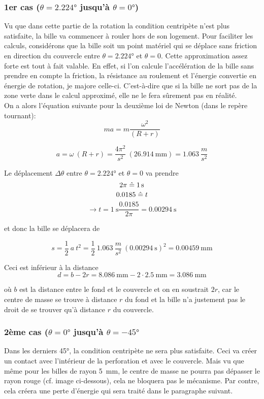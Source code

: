 \subsubsection{1er cas ($\theta = \ang{2.224}$
jusqu'à $\theta = \ang{0}$)}
Vu que dans cette partie de la rotation la condition centripète n'est plus satisfaite, la bille va commencer à rouler hors de son logement. Pour faciliter les calculs, considérons que la bille soit un point matériel qui se déplace sans friction en direction du couvercle entre $\theta = \ang{2.224}$
et $\theta = 0$. 
Cette approximation assez forte est tout à fait valable. En effet, si l'on calcule l'accélération de la bille sans prendre en compte la friction, la résistance au roulement et l'énergie convertie en énergie de rotation, je majore celle-ci. C'est-à-dire que si la bille ne sort pas de la zone verte dans le calcul approximé, elle ne le fera sûrement pas en réalité.\\

On a alors l'équation suivante pour la deuxième loi de Newton (dans le repère tournant):
\[ma = m \frac{\omega^{2}}{(R + r)}\]

\[a = \omega \ (R + r) = \frac{4 \pi^{2}}{s^{2}} \ (\SI{26.914}{\milli\metre}) = 1.063 \ \frac{m}{s^{2}}\]

Le déplacement $\Delta\theta$ entre $\theta =\ang{2.224}$ et $\theta = 0$ va prendre
\[2 \pi \estimates \SI{1}{\s}\]
\[0.0185 \mathrel{\hat{=}} t \]
\[\rightarrow t = \SI{1}{\s} \frac{0.0185}{2 \pi} = \SI{0.00294}{\second}\]

et donc la bille se déplacera de 

\[s = \frac{1}{2} \ a \ t^{2} = \frac{1}{2} \ 1.063 \ \frac{m}{s^{2}} \ (\SI{0.00294}{\s})^{2} = \SI{0.00459}{\milli\metre}\]

Ceci est inférieur à la distance 
\[d = b - 2r = \SI{8.086}{\milli\metre} - 2 \cdot \SI{2.5}{\milli\metre} = \SI{3.086}{\milli\metre}\]

où $b$ est la distance entre le fond et le couvercle et on en soustrait $2r$, car le centre de masse se trouve à distance $r$ du fond et la bille n'a justement pas le droit de se trouver qu'à distance $r$ du couvercle.

\subsubsection{2ème cas ($\theta = \ang{0}$ jusqu'à $\theta = \ang{-45}$}
Dans les derniers \ang{45}, la condition centripète ne sera plus satisfaite. Ceci va créer un contact avec l'intérieur de la perforation et avec le couvercle. Mais vu que même pour les billes de rayon \SI{5}{\milli\metre}, le centre de masse ne pourra pas dépasser le rayon rouge (cf. image ci-dessous), cela ne bloquera pas le mécanisme.
Par contre, cela créera une perte d'énergie qui sera traité dans le paragraphe suivant.

